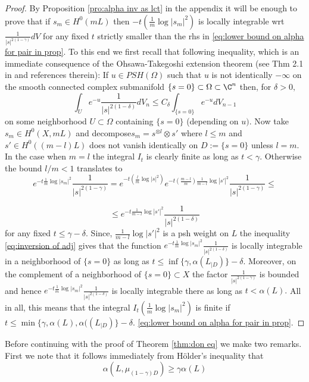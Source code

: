 \documentclass[11pt,oneside,english]{amsart}
\numberwithin{equation}{section}
\numberwithin{figure}{section}
\theoremstyle{plain}
\theoremstyle{plain}
\theoremstyle{plain}
\theoremstyle{plain}
\theoremstyle{remark}
\theoremstyle{definition}
\begin{document}
\begin{proof}
By Proposition \ref{pro:alpha inv as lct} in the appendix it will
be enough to prove that if $s_{m}\in H^{0}(mL)$ then $-t(\frac{1}{m}\log|s_{m}|^{2})$
is locally integrable wrt $\frac{1}{|s|^{2(1-\gamma)}}dV$ for any
fixed $t$ strictly smaller than the rhs in \ref{eq:lower bound on alpha for pair in prop}.
To this end we first recall that following inequality, which is an
immediate consequence of the Ohsawa-Takegoshi extension theorem (see
Thm 2.1 in \cite{d-j} and references therein): If $u\in PSH(\Omega)$
such that $u$ is not identically $-\infty$ on the smooth connected
complex submanifold $\{s=0\}\subset\Omega\subset\C^{n}$ then, for
$\delta>0,$ 
\begin{equation}
\int_{U}e^{-u}\frac{1}{|s|^{2(1-\delta)}}dV_{n}\leq C_{\delta}\int_{\{s=0\}}e^{-u}dV_{n-1}\label{eq:inversion of adj}
\end{equation}
 on some neighborhood $U\subset\Omega$ containing $\{s=0\}$ (depending
on $u).$ Now take $s_{m}\in H^{0}(X,mL)$ and decompose$s_{m}=s^{\otimes l}\otimes s'$
where $l\leq m$ and $s'\in H^{0}((m-l)L)$ does not vanish identically
on $D:=\{s=0\}$ unless $l=m.$ In the case when $m=l$ the integral
$I_{t}$ is clearly finite as long as $t<\gamma.$ Otherwise the bound
$l/m<1$ translates to 
\[
e^{-t\frac{1}{m}\log|s_{m}|^{2}}\frac{1}{|s|^{2(1-\gamma)}}=e^{-t(\frac{l}{m}\log|s|^{2})}e^{-t(\frac{m-l}{m})\frac{1}{m-l}\log|s'|^{2}}\frac{1}{|s|^{2(1-\gamma)}}\leq
\]
 
\[
\leq e^{-t\frac{1}{m-l}\log|s'|^{2}}\frac{1}{|s|^{2(1-\delta)}}
\]
 for any fixed $t\leq\gamma-\delta.$ Since, $\frac{1}{m-l}\log|s'|^{2}$
is a psh weight on $L$ the inequality \ref{eq:inversion of adj}
gives that the function $e^{-t\frac{1}{m}\log|s_{m}|^{2}}\frac{1}{|s|^{2(1-\delta)}}$
is locally integrable in a neighborhood of $\{s=0\}$ as long as $t\leq\inf\{\gamma,\alpha(L_{|D})\}-\delta.$
Moreover, on the complement of a neighborhood of $\{s=0\}\subset X$
the factor $\frac{1}{|s|^{2(1-\gamma)}}$ is bounded and hence $e^{-t\frac{1}{m}\log|s_{m}|^{2}}\frac{1}{|s|^{2(1-\delta)}}$
is locally integrable there as long as $t<\alpha(L).$ All in all,
this means that the integral $I_{t}(\frac{1}{m}\log|s_{m}|^{2})$
is finite if $t\leq\min\{\gamma,\alpha(L),\alpha((L_{|D})\}-\delta.$
\ref{eq:lower bound on alpha for pair in prop}. 
\end{proof}
Before continuing with the proof of Theorem \ref{thm:don eq} we make
two remarks. First we note that it follows immediately from Hölder's
inequality that 
\[
\alpha(L,\mu_{(1-\gamma)D})\geq\gamma\alpha(L)
\]
\end{document}
